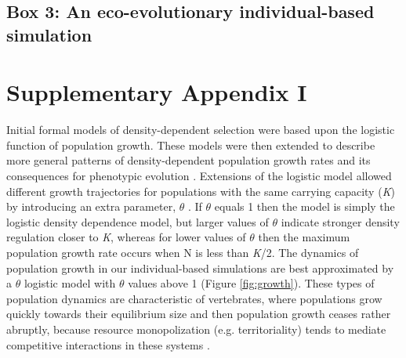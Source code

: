 \documentclass{article}
\begin{document}
\subsection{Box 3: An eco-evolutionary individual-based simulation}
\setcounter{table}{0}     

\section{Supplementary Appendix I}
 Initial formal models of density-dependent selection \citep{Anderson1971, Charlesworth1971} were based upon the logistic function of population growth. These models were then extended to describe more general patterns of density-dependent population growth rates \citep{Gilpin1973a} and its consequences for phenotypic evolution \citep{Gilpin1976}. Extensions of the logistic model allowed different growth trajectories for populations with the same carrying capacity (\textit{K}) by introducing an extra parameter, $\theta$ \citep{Lande2003}. If $\theta$ equals 1 then the model is simply the logistic density dependence model, but larger values of $\theta$ indicate stronger density regulation closer to \textit{K}, whereas for lower values of $\theta$ then the maximum population growth rate occurs when N is less than \textit{K}/2. The dynamics of population growth in our individual-based simulations are best approximated by a $\theta$ logistic model with $\theta$ values above 1 (Figure \ref{fig:growth}). These types of population dynamics are characteristic of vertebrates, where populations grow quickly towards their equilibrium size and then population growth ceases rather abruptly, because resource monopolization (e.g. territoriality) tends to mediate competitive interactions in these systems \citep{Gilpin1973a}. 
 
\end{document}
